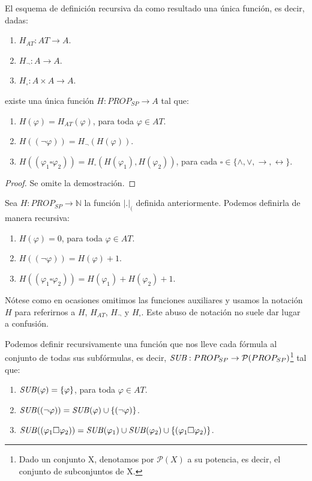  \begin{prop} El esquema de definición recursiva da como resultado una única función, es decir, dadas:
\begin{enumerate}
    \item $H_{AT}: AT \rightarrow A$.
    \item $H_{\neg}: A \rightarrow A$.
    \item $H_{\square}: A \times A \rightarrow A$.
\end{enumerate}
existe una única función $H: PROP_{SP} \rightarrow A$ tal que:
\begin{enumerate}
    \item $H(\varphi) = H_{AT}(\varphi)$, para toda $\varphi \in AT$.
    \item $H((\neg \varphi)) = H_{\neg}(H(\varphi))$.
    \item $H((\varphi_1 \square \varphi_2)) = H_{\square}(H(\varphi_1), H(\varphi_2))$, para cada $\square\in \{\land, \lor, \rightarrow, \leftrightarrow\}$.
\end{enumerate}
\begin{proof}
     Se omite la demostración.
\end{proof}
\end{prop}

\begin{example} Sea $H: PROP_{SP} \rightarrow \mathbb{N}$ la función $|.|_($ definida anteriormente. Podemos definirla de manera recursiva:
\begin{enumerate}
    \item $H(\varphi) = 0$, para toda $\varphi \in AT$.
    \item $H((\neg \varphi)) = H(\varphi) + 1$.
    \item $H((\varphi_1 \square \varphi_2)) = H(\varphi_1) + H(\varphi_2) + 1$.
\end{enumerate}
Nótese como en ocasiones omitimos las funciones auxiliares y usamos la notación $H$ para referirnos a $H$, $H_{AT}$, $H_{\neg}$ y $H_{\square}$. Este abuso de notación no suele dar lugar a confusión.
\end{example}



\begin{example} Podemos definir recursivamente una función que nos lleve cada fórmula al conjunto de todas sus subfórmulas, es decir,  $\text{\textit{\text{\textit{SUB}}}}: PROP_{SP} \rightarrow \mathcal{P} (PROP_{SP})$\footnote{Dado un conjunto X, denotamos por $\mathcal{P}(X)$ a su potencia, es decir, el conjunto de subconjuntos de X.} tal que:
\begin{enumerate}
    \item $\text{\textit{SUB}}(\varphi) = \{\varphi\}$, para toda $\varphi \in AT$.
    \item $\text{\textit{SUB}}((\neg \varphi)) = \text{\textit{SUB}}(\varphi) \cup \{(\neg \varphi)\}$.
    \item $\text{\textit{SUB}}((\varphi_1 \square \varphi_2)) = \text{\textit{SUB}}(\varphi_1) \cup \text{\textit{SUB}}(\varphi_2) \cup \{(\varphi_1 \square \varphi_2)\}$.
\end{enumerate}
\end{example} 


